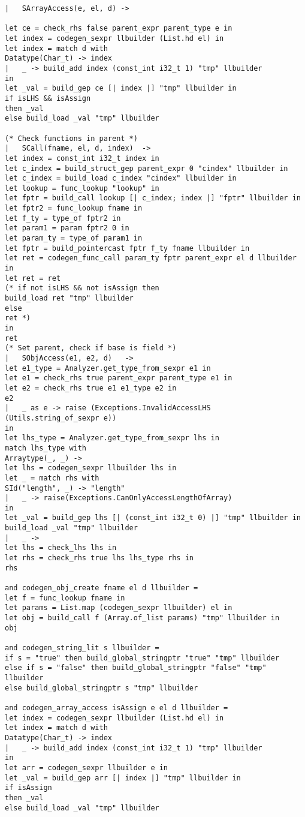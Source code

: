 \begin{verbatim}
| 	SArrayAccess(e, el, d) ->

let ce = check_rhs false parent_expr parent_type e in
let index = codegen_sexpr llbuilder (List.hd el) in
let index = match d with
Datatype(Char_t) -> index
| 	_ -> build_add index (const_int i32_t 1) "tmp" llbuilder
in
let _val = build_gep ce [| index |] "tmp" llbuilder in
if isLHS && isAssign
then _val
else build_load _val "tmp" llbuilder 

(* Check functions in parent *)
| 	SCall(fname, el, d, index) 	-> 
let index = const_int i32_t index in
let c_index = build_struct_gep parent_expr 0 "cindex" llbuilder in
let c_index = build_load c_index "cindex" llbuilder in
let lookup = func_lookup "lookup" in
let fptr = build_call lookup [| c_index; index |] "fptr" llbuilder in
let fptr2 = func_lookup fname in
let f_ty = type_of fptr2 in
let param1 = param fptr2 0 in
let param_ty = type_of param1 in
let fptr = build_pointercast fptr f_ty fname llbuilder in
let ret = codegen_func_call param_ty fptr parent_expr el d llbuilder in
let ret = ret
(* if not isLHS && not isAssign then
build_load ret "tmp" llbuilder
else
ret *)
in
ret
(* Set parent, check if base is field *)
| 	SObjAccess(e1, e2, d) 	-> 
let e1_type = Analyzer.get_type_from_sexpr e1 in
let e1 = check_rhs true parent_expr parent_type e1 in
let e2 = check_rhs true e1 e1_type e2 in
e2
| 	_ as e -> raise (Exceptions.InvalidAccessLHS (Utils.string_of_sexpr e))
in 
let lhs_type = Analyzer.get_type_from_sexpr lhs in 
match lhs_type with
Arraytype(_, _) -> 
let lhs = codegen_sexpr llbuilder lhs in
let _ = match rhs with
SId("length", _) -> "length"
| 	_ -> raise(Exceptions.CanOnlyAccessLengthOfArray)
in
let _val = build_gep lhs [| (const_int i32_t 0) |] "tmp" llbuilder in
build_load _val "tmp" llbuilder 
| 	_ -> 
let lhs = check_lhs lhs in
let rhs = check_rhs true lhs lhs_type rhs in
rhs

and codegen_obj_create fname el d llbuilder = 
let f = func_lookup fname in
let params = List.map (codegen_sexpr llbuilder) el in
let obj = build_call f (Array.of_list params) "tmp" llbuilder in
obj

and codegen_string_lit s llbuilder = 
if s = "true" then build_global_stringptr "true" "tmp" llbuilder
else if s = "false" then build_global_stringptr "false" "tmp" llbuilder
else build_global_stringptr s "tmp" llbuilder

and codegen_array_access isAssign e el d llbuilder =
let index = codegen_sexpr llbuilder (List.hd el) in
let index = match d with
Datatype(Char_t) -> index
| 	_ -> build_add index (const_int i32_t 1) "tmp" llbuilder
in
let arr = codegen_sexpr llbuilder e in
let _val = build_gep arr [| index |] "tmp" llbuilder in
if isAssign
then _val
else build_load _val "tmp" llbuilder 


\end{verbatim}
